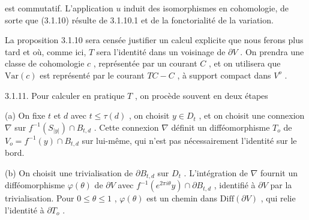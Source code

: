 
\begin{center}
\end{center}
 est commutatif. L'application $u$ induit des isomorphismes en cohomologie, de sorte que (3.1.10) résulte de 3.1.10.1 et de la fonctorialité de la variation.

La proposition 3.1.10 sera censée justifier un calcul explicite que nous ferons plus tard et où, comme ici, $T$ sera l'identité dans un voisinage de $\partial V$ . On prendra une classe de cohomologie $c$ , représentée par un courant $C$ , et on utilisera que $\mathrm{Var}(c)$ est représenté par le courant $TC - C$ , à support compact dans $V^o$ .

3.1.11. Pour calculer en pratique $T$ , on procède souvent en deux étapes

(a) On fixe $t$ et $d$ avec $t \leq \tau(d)$ , on choisit $y \in D_t$ , et on choisit une connexion $\nabla$ sur $f^{-1}(S_{|y|}) \cap B_{t,d}$ . Cette connexion $\nabla$ définit un difféomorphisme $T_o$ de $V_o = f^{-1}(y) \cap B_{t,d}$ sur lui-même, qui n'est pas nécessairement l'identité sur le bord.

(b) On choisit une trivialisation de $\partial B_{t,d}$ sur $D_t$ . L'intégration de $\nabla$ fournit un difféomorphisme $\varphi(\theta)$ de $\partial V$ avec $f^{-1}(e^{2\pi i\theta}y) \cap \partial B_{t,d}$ , identifié à $\partial V$ par la trivialisation. Pour $0 \leq \theta \leq 1$ , $\varphi(\theta)$ est un chemin dans $\mathrm{Diff}(\partial V)$ , qui relie l'identité à $\partial T_o$ .


